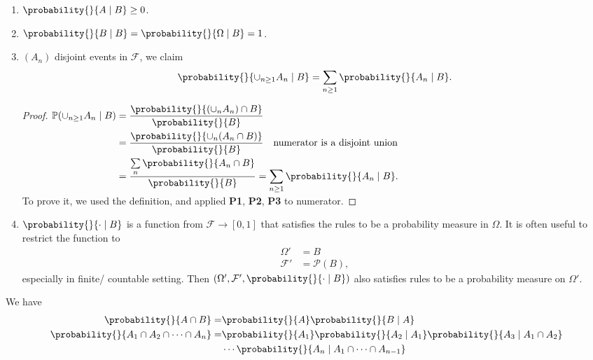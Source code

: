 \begin{property}
    \leavevmode
    \begin{enumerate}
        \item \(\probability{}{A\mid B} \geq 0\).
        \item \(\probability{}{B\mid B}  = \probability{}{\Omega\mid B} = 1\).
        \item \((A_n)\) disjoint events in \(\mathcal{F}\), we claim
        \[
            \probability{}{\cup_{n\geq 1}A_n \mid B} = \sum\limits_{n\geq 1}\probability{}{A_n \mid B}.
        \]
        \begin{proof}
            \(\begin{aligned}[t]
                \mathbb{P}(\cup_{n\geq 1}A_n \mid B) &= \frac{\probability{}{(\cup_n A_n)\cap B}}{\probability{}{B}}\\
                &= \frac{\probability{}{\cup_n (A_n \cap B)}}{\probability{}{B}} \quad \text{numerator is a disjoint union}\\
                &=\frac{\sum\limits_{n}\probability{}{A_n \cap B}}{\probability{}{B}} = \sum\limits_{n\geq 1}\probability{}{A_n \mid B}.
            \end{aligned}\)\\
            To prove it, we used the definition, and applied \textbf{P1}, \textbf{P2}, \textbf{P3} to numerator.
        \end{proof}
        \item \(\probability{}{\cdot \mid B} \) is a function from \(\mathcal{F} \to [0,1]\) that satisfies the rules to be a probability measure in \(\Omega\). It is often useful to restrict the function to
        \begin{align*}
            \Omega' &= B\\
            \mathcal{F}' &= \mathcal{P}(B),
        \end{align*}
        especially in finite/ countable setting. Then \((\Omega', \mathcal{F} ', \probability{}{\cdot\mid B})\) also satisfies rules to be a probability measure on \(\Omega'\).
    \end{enumerate}
\end{property}
We have
\begin{align*}
    \probability{}{A\cap B} =& \probability{}{A} \probability{}{B\mid A}\\
    \probability{}{A_1 \cap A_2 \cap \cdots \cap A_n} =& \probability{}{A_1} \probability{}{A_2\mid A_1} \probability{}{A_3 \mid A_1 \cap A_2} \\
    &\cdots\probability{}{A_n \mid A_1 \cap \cdots \cap A_{n - 1}} 
\end{align*}
